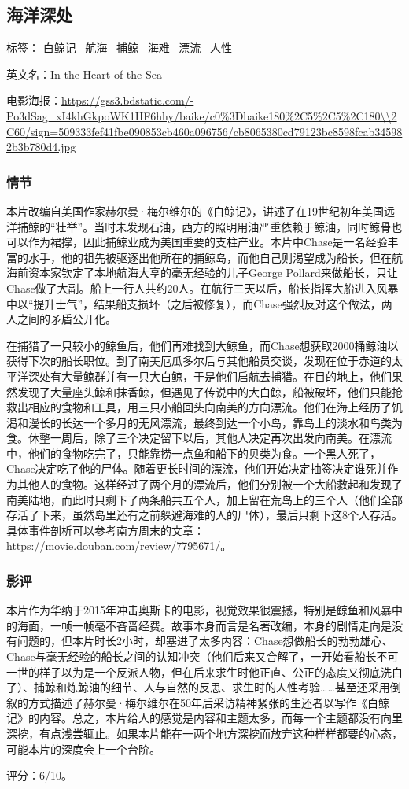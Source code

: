 \subsection{海洋深处}

标签： 白鲸记 \ 航海  \  捕鲸 \ 海难 \  漂流 \ 人性

英文名：In the Heart of the Sea

电影海报：\url{https://gss3.bdstatic.com/-Po3dSag_xI4khGkpoWK1HF6hhy/baike/c0\%3Dbaike180\%2C5\%2C5\%2C180\\2C60/sign=509333fef41fbe090853cb460a096756/cb8065380cd79123bc8598fcab345982b3b780d4.jpg}

\subsubsection{情节}
本片改编自美国作家赫尔曼·梅尔维尔的《白鲸记》，讲述了在19世纪初年美国远洋捕鲸的“壮举”。当时未发现石油，西方的照明用油严重依赖于鲸油，同时鲸骨也可以作为裙撑，因此捕鲸业成为美国重要的支柱产业。本片中Chase是一名经验丰富的水手，他的祖先被驱逐出他所在的捕鲸岛，而他自己则渴望成为船长，但在航海前资本家钦定了本地航海大亨的毫无经验的儿子George Pollard来做船长，只让Chase做了大副。船上一行人共约20人。在航行三天以后，船长指挥大船进入风暴中以“提升士气”，结果船支损坏（之后被修复），而Chase强烈反对这个做法，两人之间的矛盾公开化。

在捕猎了一只较小的鲸鱼后，他们再难找到大鲸鱼，而Chase想获取2000桶鲸油以获得下次的船长职位。到了南美厄瓜多尔后与其他船员交谈，发现在位于赤道的太平洋深处有大量鲸群并有一只大白鲸，于是他们启航去捕猎。在目的地上，他们果然发现了大量座头鲸和抹香鲸，但遇见了传说中的大白鲸，船被破坏，他们只能抢救出相应的食物和工具，用三只小船回头向南美的方向漂流。他们在海上经历了饥渴和漫长的长达一个多月的无风漂流，最终到达一个小岛，靠岛上的淡水和鸟类为食。休整一周后，除了三个决定留下以后，其他人决定再次出发向南美。在漂流中，他们的食物吃完了，只能靠捞一点鱼和船下的贝类为食。一个黑人死了，Chase决定吃了他的尸体。随着更长时间的漂流，他们开始决定抽签决定谁死并作为其他人的食物。这样经过了两个月的漂流后，他们分别被一个大船救起和发现了南美陆地，而此时只剩下了两条船共五个人，加上留在荒岛上的三个人（他们全部存活了下来，虽然岛里还有之前躲避海难的人的尸体），最后只剩下这8个人存活。具体事件剖析可以参考南方周末的文章：\url{https://movie.douban.com/review/7795671/}。

\subsubsection{影评}
本片作为华纳于2015年冲击奥斯卡的电影，视觉效果很震撼，特别是鲸鱼和风暴中的海面，一帧一帧毫不吝啬经费。故事本身而言是名著改编，本身的剧情走向是没有问题的，但本片时长2小时，却塞进了太多内容：Chase想做船长的勃勃雄心、Chase与毫无经验的船长之间的认知冲突（他们后来又合解了，一开始看船长不可一世的样子以为是一个反派人物，但在后来求生时他正直、公正的态度又彻底洗白了）、捕鲸和炼鲸油的细节、人与自然的反思、求生时的人性考验……甚至还采用倒叙的方式描述了赫尔曼·梅尔维尔在50年后采访精神紧张的生还者以写作《白鲸记》的内容。总之，本片给人的感觉是内容和主题太多，而每一个主题都没有向里深挖，有点浅尝辄止。如果本片能在一两个地方深挖而放弃这种样样都要的心态，可能本片的深度会上一个台阶。

评分：6/10。